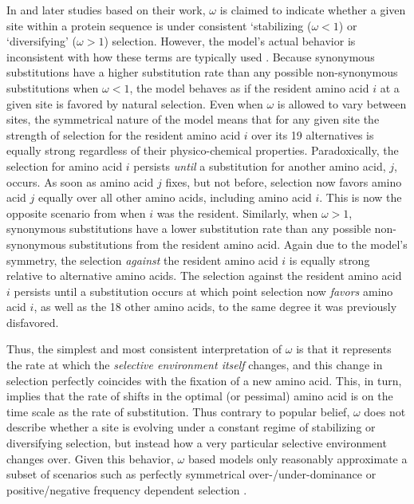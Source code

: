 \documentclass[12pt,letterpaper]{article}
\newcommand{\PC}{physico-chemical\xspace}
\begin{document}
In \citet{GoldmanAndYang1994,YangAndNielsen1998,NielsenAndYang1998} and later studies based on their work, $\omega$ is claimed to indicate whether a given site within a protein sequence is under consistent `stabilizing ($\omega < 1$) or `diversifying' ($\omega > 1$) selection.
However, the model's actual behavior is inconsistent with how these terms are typically used \citep{Pellmyr2002}. %
Because synonymous substitutions have a higher substitution rate than any possible non-synonymous substitutions when $\omega < 1$, the model behaves as if the resident amino acid $i$ at a given site is favored by natural selection.
Even when $\omega$ is allowed to vary between sites, the symmetrical nature of the model means that for any given site the strength of selection for the resident amino acid $i$ over its 19 alternatives is equally strong regardless of their \PC properties.
Paradoxically, the selection for amino acid $i$ persists \emph{until} a substitution for another amino acid, $j$, occurs.
As soon as amino acid $j$ fixes, but not before, selection now favors amino acid $j$ equally over all other amino acids, including amino acid $i$.
This is now the opposite scenario from when $i$ was the resident.
Similarly, when $\omega > 1$, synonymous substitutions have a lower substitution rate than any possible non-synonymous substitutions from the resident amino acid.
Again due to the model's symmetry, the selection \emph{against} the resident amino acid $i$ is equally strong relative to alternative amino acids.
The selection against the resident amino acid $i$ persists until a substitution occurs at which point selection now \emph{favors} amino acid $i$, as well as the 18 other amino acids, to the same degree it was previously disfavored.

Thus, the simplest and most consistent interpretation of $\omega$ is that it represents the rate at which the \emph{selective environment itself} changes, and this change in selection perfectly coincides with the fixation of a new amino acid.
This, in turn, implies that the rate of shifts in the optimal (or pessimal) amino acid is on the time scale as the rate of substitution.
Thus contrary to popular belief,  $\omega$ does not describe whether a site is evolving under a constant regime of stabilizing or diversifying selection, but instead how a very particular selective environment changes over.
Given this behavior, $\omega$ based models only reasonably approximate a subset of scenarios such as perfectly symmetrical over-/under-dominance or positive/negative frequency dependent selection \citep{HughesAndNei1988,Nowak2006}.
\end{document}
